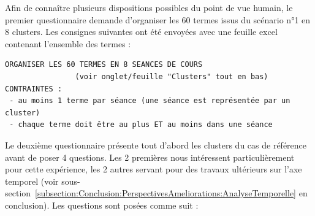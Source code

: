 \bigskip

Afin de connaître plusieurs dispositions possibles du point de vue humain, le premier questionnaire demande d'organiser les 60 termes issus du scénario n°1 en 8 clusters.
Les consignes suivantes ont été envoyées avec une feuille excel contenant l'ensemble des termes :
\begin{verbatim}
ORGANISER LES 60 TERMES EN 8 SEANCES DE COURS
				(voir onglet/feuille "Clusters" tout en bas)
CONTRAINTES :
 - au moins 1 terme par séance (une séance est représentée par un cluster)
 - chaque terme doit être au plus ET au moins dans une séance
\end{verbatim}

\bigskip

Le deuxième questionnaire présente tout d'abord les clusters du cas de référence avant de poser 4 questions.
Les 2 premières nous intéressent particulièrement pour cette expérience, les 2 autres servant pour des travaux ultérieurs sur l'axe temporel (voir sous-section~\ref{subsection:Conclusion:PerspectivesAmeliorations:AnalyseTemporelle} en conclusion).
Les questions sont posées comme suit :
